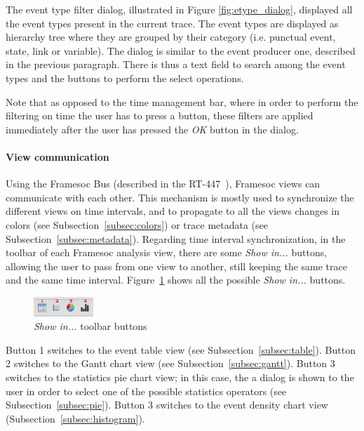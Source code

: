 \documentclass[twoside]{article}
\begin{document}
\begin{sloppypar}
The event type filter dialog, illustrated in Figure \ref{fig:etype_dialog}, displayed all the event types present in the current trace. The event types are displayed as hierarchy tree where they are grouped by their category (i.e. punctual event, state, link or variable). The dialog is similar to the event producer one, described in the previous paragraph. There is thus a text field to search among the event types and the buttons to perform the select operations.

Note that as opposed to the time management bar, where in order to perform the filtering on time the user has to press a button, these filters are applied immediately after the user has pressed the \emph{OK} button in the dialog.

\paragraph{View communication} Using the Framesoc Bus (described in the RT-447~\cite{pagano:hal-00977887}), Framesoc views can communicate with each other. This mechanism is mostly used to synchronize the different views on time intervals, and to propagate to all the views changes in colors (see Subsection~\ref{subsec:colors}) or trace metadata (see Subsection~\ref{subsec:metadata}).
Regarding time interval synchronization, in the toolbar of each Framesoc analysis view, there are some \emph{Show in...} buttons, allowing the user to pass from one view to another, still keeping the same trace and the same time interval. Figure~\ref{fig:show_in} shows all the possible \emph{Show in...} buttons. 

\begin{figure}[h!]
  \centering
    \includegraphics[width=0.2\textwidth]{images/show_in_icons.png}
  \caption{\emph{Show in...} toolbar buttons}
  \label{fig:show_in}
\end{figure}

Button \num{1} switches to the event table view (see Subsection~\ref{subsec:table}). Button \num{2} switches to the Gantt chart view (see Subsection~\ref{subsec:gantt}). Button \num{3} switches to the statistics pie chart view; in this case, the a dialog is shown to the user in order to select one of the possible statistics operators (see Subsection~\ref{subsec:pie}). Button \num{3} switches to the event density chart view (Subsection~\ref{subsec:histogram}).


\end{sloppypar}
\end{document}
